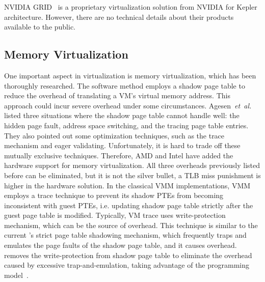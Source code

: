 NVIDIA GRID~{\cite{website:nvidiagrid}} is a proprietary virtualization solution from NVIDIA for Kepler architecture. However, there are no technical details about their products available to the public.

\subsection{Memory Virtualization}

One important aspect in \gpu{} virtualization is memory virtualization, which has been thoroughly researched. The software method employs a shadow page table to reduce the overhead of translating a VM's virtual memory address. This approach could incur severe overhead under some circumstances. Agesen~\emph{et~al.}~{\cite{agesen2010evolution}} listed three situations where the shadow page table cannot handle well: the hidden page fault, address space switching, and the tracing page table entries. They also pointed out some optimization techniques, such as the trace mechanism and eager validating. Unfortunately, it is hard to trade off these mutually exclusive techniques. Therefore, AMD and Intel have added the hardware support for memory virtualization. All three overheads previously listed before can be eliminated, but it is not the silver bullet, a TLB miss punishment is higher in the hardware solution.
\hspace{0pt}
In the classical VMM implementations, VMM employs a trace technique to prevent its shadow PTEs from becoming inconsistent with guest PTEs, i.e. updating shadow page table strictly after the guest page table is modified. Typically, VM trace uses write-protection mechanism, which can be the source of overhead. This technique is similar to the current \gvirt{}'s strict page table shadowing mechanism, which frequently traps and emulates the page faults of the shadow page table, and it causes overhead. \name{} removes the write-protection from shadow page table to eliminate the overhead caused by excessive trap-and-emulation, taking advantage of the \gpu{} programming model~{\cite{adams2006comparison}}.
